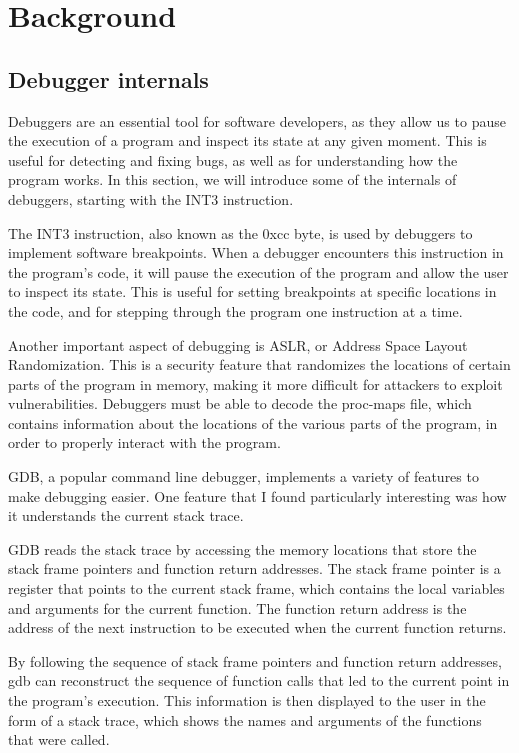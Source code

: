 \chapter{Background}
\section{Debugger internals}
Debuggers are an essential tool for software developers, as they allow us to pause the execution of a program and inspect its state at any given moment. This is useful for detecting and fixing bugs, as well as for understanding how the program works. In this section, we will introduce some of the internals of debuggers, starting with the INT3 instruction.

The INT3 instruction, also known as the 0xcc byte, is used by debuggers to implement software breakpoints. When a debugger encounters this instruction in the program's code, it will pause the execution of the program and allow the user to inspect its state. This is useful for setting breakpoints at specific locations in the code, and for stepping through the program one instruction at a time.

Another important aspect of debugging is ASLR, or Address Space Layout Randomization. This is a security feature that randomizes the locations of certain parts of the program in memory, making it more difficult for attackers to exploit vulnerabilities. Debuggers must be able to decode the proc-maps file, which contains information about the locations of the various parts of the program, in order to properly interact with the program.

GDB, a popular command line debugger, implements a variety of features to make debugging easier. One feature that I found particularly interesting was how it understands the current stack trace.

GDB reads the stack trace by accessing the memory locations that store the stack frame pointers and function return addresses. The stack frame pointer is a register that points to the current stack frame, which contains the local variables and arguments for the current function. The function return address is the address of the next instruction to be executed when the current function returns.

By following the sequence of stack frame pointers and function return addresses, gdb can reconstruct the sequence of function calls that led to the current point in the program's execution. This information is then displayed to the user in the form of a stack trace, which shows the names and arguments of the functions that were called.

